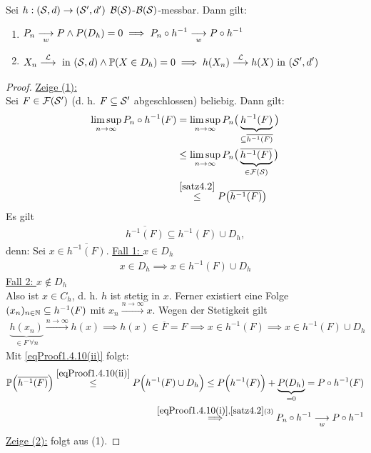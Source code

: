 \begin{satz}\enter\label{satz4.10ContinuousMappingTheorem}
Sei $h:(\S,d)\to(\S',d')$ $\B(\S)$-$\B(\S)$-messbar. Dann gilt:
\begin{enumerate}[label=(\arabic*)]
\item $\begin{aligned}
P_n\stackrelnew{w}{}{\longrightarrow} P\wedge P(D_h)=0
\implies P_n\circ h^{-1}\stackrelnew{w}{}{\longrightarrow} P\circ h^{-1}
\end{aligned}$
\item $\begin{aligned}
X_n\stackrel{\L}{\longrightarrow}\text{ in }(\S,d)\wedge\P(X\in D_h)=0
\implies h(X_n)\stackrel{\L}{\longrightarrow} h(X)\text{ in }(\S',d') 
\end{aligned}$
\end{enumerate}
\end{satz}
\begin{proof}
\underline{Zeige (1):}\\
Sei $F\in\F(\S')$ (d. h. $F\subseteq\S'$ abgeschlossen) beliebig. Dann gilt:
\begin{align}\label{eqProof1.4.10(i)}
\limsup\limits_{n\to\infty} P_n\circ h^{-1}(F)
&=\limsup\limits_{n\to\infty} P_n\big(\underbrace{h^{-1}(F)}_{\subseteq \overline{h^{-1}(F)}}\big)\\\nonumber
&\leq \limsup\limits_{n\to\infty} P_n\big(\underbrace{\overline{h^{-1}(F)}}_{\in\F(\S)}\big)\\\nonumber
&\stackrel{\ref{satz4.2}}{\leq}
P\big(\overline{h^{-1}(F)}\big)
\end{align}
Es gilt
\begin{align}\label{eqProof1.4.10(ii)}
\overline{h^{-1}(F)}\subseteq h^{-1}(F)\cup D_h,
\end{align}
denn: Sei $x\in\overline{h^{-1}(F)}$.\nl
\underline{Fall 1: $x\in D_h$}
\begin{align*}
x\in D_h\implies x\in h^{-1}(F)\cup D_h
\end{align*}
\underline{Fall 2: $x\not\in D_h$}\\
Also ist $x\in C_h$, d. h. $h$ ist stetig in $x$. Ferner existiert eine Folge $(x_n)_{n\in\N}\subseteq h^{-1}(F)$ mit $x_n\stackrel{n\to\infty}{\longrightarrow} x$. Wegen der Stetigkeit gilt
\begin{align*}
\underbrace{h(x_n)}_{\in F~\forall n}\stackrel{n\to\infty}{\longrightarrow} h(x)
\implies h(x)\in\overline{F}=F\implies x\in h^{-1}(F)
\implies x\in h^{-1}(F)\cup D_h
\end{align*}
Mit \eqref{eqProof1.4.10(ii)} folgt:
\begin{align*}
\P\Big(\overline{h^{-1}(F)}\Big)
\stackrel{\eqref{eqProof1.4.10(ii)}}{\leq}
P\Big(h^{-1}(F)\cup D_h\Big)
\leq P\Big(h^{-1}(F)\Big)+\underbrace{P(D_h)}_{=0}
=P\circ h^{-1}(F)\\
\stackrel{\eqref{eqProof1.4.10(i)},\ref{satz4.2}(3)}{\implies} 
P_n\circ h^{-1}\stackrelnew{w}{}{\longrightarrow} P\circ h^{-1}
\end{align*}
\underline{Zeige (2):} folgt aus (1).
\end{proof}

